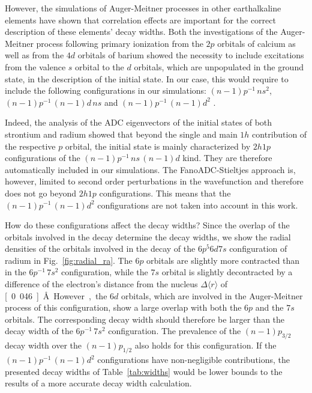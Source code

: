 However, the simulations of Auger-Meitner processes in other earthalkaline elements
have shown that correlation effects are important for the correct
description of these elements' decay widths. Both the investigations of
the Auger-Meitner process following primary ionization
from the $2p$ orbitals of calcium \cite{Nikkinen05}
as well as from the $4d$ orbitals of barium \cite{Rose80}
showed the necessity to include excitations from the valence $s$ orbital to
the $d$ orbitals, which are unpopulated in the ground state, in the
description of the initial state.
In our case, this would require to include the following configurations in our
simulations:
 $(n-1)p^{-1} \,ns^2$,
 $(n-1)p^{-1} \,(n-1)d \, ns$ and
 $(n-1)p^{-1} \,(n-1)d^2$ .    

Indeed, the analysis of the ADC eigenvectors of the initial states of both
strontium and radium showed
that beyond the single and main $1h$ contribution of the respective $p$ orbital, the
initial state is mainly characterized by $2h1p$ configurations of the
$(n-1)p^{-1} \,ns \, (n-1)d$ kind. They
are therefore automatically included in our simulations.
The FanoADC-Stieltjes approach is, however, limited
to second order perturbations in the wavefunction
and therefore does not go beyond $2h1p$ configurations. This means that the
$(n-1)p^{-1} \,(n-1)d^2$ configurations are not taken into account in this work.

How do these configurations affect the decay widths? Since the overlap of the
orbitals involved in the decay determine the decay widths, we show the
radial densities of the orbitals involved in the decay of the $6p^5 6d 7s$
configuration of radium in Fig.~\ref{fig:radial_ra}.
The $6p$ orbitals are slightly more contracted than in the $6p^{-1} \,7s^2$
configuration, while the $7s$ orbital is slightly decontracted by a difference
of the electron's distance from the nucleus $\Delta \langle r \rangle$
of \unit[0.046]{\AA}.
However, the $6d$ orbitals, which are involved
in the Auger-Meitner process of this configuration, show a large overlap with both
the $6p$ and the $7s$ orbitals. The corresponding decay width should therefore
be larger than the decay width of the $6p^{-1} \,7s^2$ configuration.
The prevalence of the $(n-1)p_{3/2}$ decay width over the $(n-1)p_{1/2}$
also holds for this configuration.
If the $(n-1)p^{-1} \,(n-1)d^2$ configurations
have non-negligible contributions,
the presented decay widths of Table~\ref{tab:widths} would be
lower bounds to the results of a more accurate decay width calculation.

